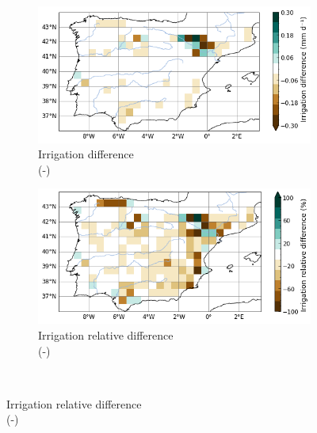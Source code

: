 \begin{figure}[htbp]
    \begin{subfigure}[b]{0.48\textwidth}
        \caption{Irrigation difference\\(\native -\std)}
        \includegraphics[width=\textwidth]{images/chap3/maps/irrigation_diff.png}
    \end{subfigure} 
    \begin{subfigure}[b]{0.48\textwidth}
        \caption{Irrigation relative difference\\(\native -\std)}
        \includegraphics[width=\textwidth]{images/chap3/maps/irrigation_reldiff.png}
    \end{subfigure} \\


\end{figure}
